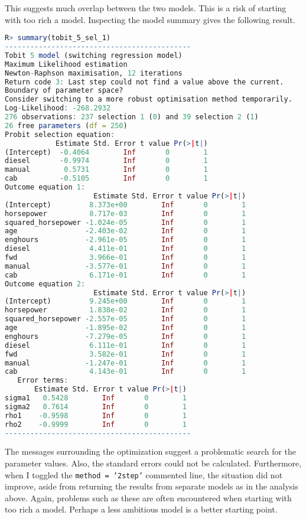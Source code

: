 This suggests much overlap between the two models.
This is a risk of starting with too rich a model. 
Inspecting the model summary gives the following result.


\begin{lstlisting}[language=R]
R> summary(tobit_5_sel_1)
--------------------------------------------
Tobit 5 model (switching regression model)
Maximum Likelihood estimation
Newton-Raphson maximisation, 12 iterations
Return code 3: Last step could not find a value above the current.
Boundary of parameter space?  
Consider switching to a more robust optimisation method temporarily.
Log-Likelihood: -268.2932 
276 observations: 237 selection 1 (0) and 39 selection 2 (1)
26 free parameters (df = 250)
Probit selection equation:
            Estimate Std. Error t value Pr(>|t|)
(Intercept)  -0.4064        Inf       0        1
diesel       -0.9974        Inf       0        1
manual        0.5731        Inf       0        1
cab          -0.5105        Inf       0        1
Outcome equation 1:
                     Estimate Std. Error t value Pr(>|t|)
(Intercept)         8.373e+00        Inf       0        1
horsepower          8.717e-03        Inf       0        1
squared_horsepower -1.024e-05        Inf       0        1
age                -2.403e-02        Inf       0        1
enghours           -2.961e-05        Inf       0        1
diesel              4.411e-01        Inf       0        1
fwd                 3.966e-01        Inf       0        1
manual             -3.577e-01        Inf       0        1
cab                 6.171e-01        Inf       0        1
Outcome equation 2:
                     Estimate Std. Error t value Pr(>|t|)
(Intercept)         9.245e+00        Inf       0        1
horsepower          1.838e-02        Inf       0        1
squared_horsepower -2.557e-05        Inf       0        1
age                -1.895e-02        Inf       0        1
enghours           -7.279e-05        Inf       0        1
diesel              6.111e-01        Inf       0        1
fwd                 3.582e-01        Inf       0        1
manual             -1.247e-01        Inf       0        1
cab                 4.143e-01        Inf       0        1
   Error terms:
       Estimate Std. Error t value Pr(>|t|)
sigma1   0.5428        Inf       0        1
sigma2   0.7614        Inf       0        1
rho1    -0.9598        Inf       0        1
rho2    -0.9999        Inf       0        1
--------------------------------------------
\end{lstlisting}

The messages surrounding the optimization suggest a problematic
search for the parameter values. 
Also, the standard errors could not be calculated.
Furthermore, when I toggled the \texttt{method = '2step'} commented line, 
the situation did not improve, aside from returning the results from separate models as in the analysis above. 
% 
Again, problems such as these are often encountered when starting with too rich a model. 
Perhaps a less ambitious model is a better starting point. 



